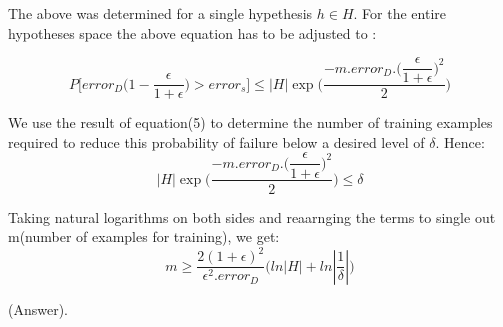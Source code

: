 \documentclass{article}
\begin{document}
    The above was determined for a single hypethesis $h \in H$. For the entire hypotheses space the above equation has to be adjusted to :
    
    \begin{equation}
    P\bigg [  error_{D}\bigg (  1 - \dfrac{\epsilon}{1 + \epsilon}  \bigg ) > error_{s}  \bigg ] \leq |H|\exp \bigg (\dfrac{-m.error_{D}.\bigg (\dfrac{\epsilon}{1 + \epsilon}\bigg )^2}{2}\bigg )
    \end{equation}
    
    We use the result of equation(5) to determine the number of training examples required to reduce this probability of failure below a desired level of $\delta$. Hence: \newline
    \[ |H|\exp \bigg (\dfrac{-m.error_{D}.\bigg (\dfrac{\epsilon}{1 + \epsilon}\bigg )^2}{2}\bigg ) \leq \delta \]
    
    Taking natural logarithms on both sides and reaarnging the terms to single out m(number of examples for training), we get: \newline
    \begin{equation}
      m \geq \dfrac{2(1 + \epsilon)^2}{\epsilon^2 . error_{D}}\bigg (  ln|H| + ln|\dfrac{1}{\delta}| \bigg )
    \end{equation}
    
    (Answer).
  
\end{document}
